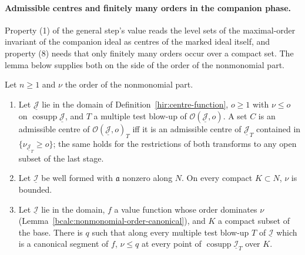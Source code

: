 \paragraph{Admissible centres and finitely many orders in the companion phase.} Property (1) of the general step's value reads the level sets
of the maximal-order invariant of the companion ideal as centres of the marked ideal itself, and property (8) needs that only finitely many orders occur
over a compact set. The lemma below supplies both on the side of the order of the nonmonomial part.

\begin{lemma}
\label{bcalc:nonmonomial-order-phase}
\mixedleanok
Let \(n\ge1\) and \(\nu\) the order of the nonmonomial part.
\begin{enumerate}
\item Let \(\underline{\mathcal J}\) lie in the domain of Definition~\ref{hir:centre-function}, \(o\ge1\) with \(\nu\le o\) on \(\operatorname{cosupp}\underline{\mathcal J}\), and \(T\) a
multiple test blow-up of \(\mathcal O(\underline{\mathcal J},o)\). A set \(C\) is an admissible centre of \(\mathcal O(\underline{\mathcal J},o)_T\) iff it is an admissible centre of
\(\underline{\mathcal J}_T\) contained in \(\{\nu_{\underline{\mathcal J}_T}\ge o\}\); the same holds for the restrictions of both transforms to any open subset of the last stage.
\item Let \(\underline{\mathcal I}\) be well formed with \(\mathfrak a\) nonzero along \(N\). On every compact \(K\subset N\), \(\nu\) is bounded.
\item Let \(\underline{\mathcal I}\) lie in the domain, \(f\) a value function whose order dominates \(\nu\) (Lemma~\ref{bcalc:nonmonomial-order-canonical}), and \(K\) a compact
subset of the base. There is \(q\) such that along every multiple test blow-up \(T\) of \(\underline{\mathcal I}\) which is a canonical segment of \(f\), \(\nu\le q\) at every
point of \(\operatorname{cosupp}\underline{\mathcal I}_T\) over \(K\).
\end{enumerate}
\end{lemma}
